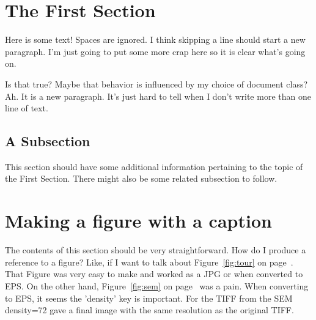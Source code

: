 \documentclass{article} %
\begin{document}
\section{The First Section} %

Here is some text! Spaces are ignored. I think skipping a line should start a new paragraph. I'm just 
going to put some more crap here so it is clear what's going on.

Is that true? Maybe that behavior is influenced by my choice of document class? Ah. It is a new paragraph.
It's just hard to tell when I don't write more than one line of text.

\subsection{A Subsection} 

This section should have some additional information pertaining to the topic of the First Section.
There might also be some related subsection to follow.

\section{Making a figure with a caption}

The contents of this section should be very straightforward. How do I produce a reference to a figure? 
Like, if I want to talk about Figure~\ref{fig:tour} on page~\pageref{fig:tour}. That Figure was very easy to 
make and worked as a JPG or when converted to EPS. On the other hand, Figure~\ref{fig:sem} on page~\pageref{fig:sem} 
was a pain. When converting to EPS, it seems the 'density' key is important. For the TIFF from the SEM density=72 gave a final image with the same resolution as the original TIFF.
\end{document}
